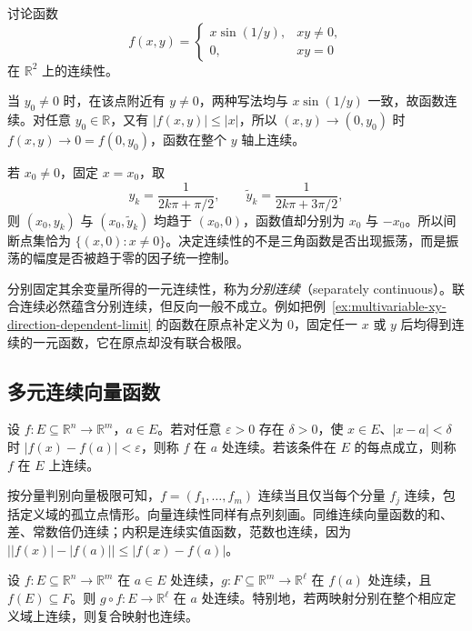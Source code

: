 \documentclass[UTF8,12pt,a4paper,fontset=fandol]{ctexbook}
\begin{document}
\begin{example}
\label{ex:oscillatory-multivariable-continuity-set}
讨论函数
\[
    f(x,y)=\begin{cases}
        x\sin(1/y),&xy\neq0,\\
        0,&xy=0
    \end{cases}
\]
在 $\mathbb R^2$ 上的连续性。
\end{example}

\begin{solve}
当 $y_0\neq0$ 时，在该点附近有 $y\neq0$，两种写法均与 $x\sin(1/y)$ 一致，故函数连续。对任意 $y_0\in\mathbb R$，又有 $|f(x,y)|\leq|x|$，所以 $(x,y)\to(0,y_0)$ 时 $f(x,y)\to0=f(0,y_0)$，函数在整个 $y$ 轴上连续。

若 $x_0\neq0$，固定 $x=x_0$，取
\[
    y_k=\frac1{2k\pi+\pi/2},\qquad
    \widetilde y_k=\frac1{2k\pi+3\pi/2},
\]
则 $(x_0,y_k)$ 与 $(x_0,\widetilde y_k)$ 均趋于 $(x_0,0)$，函数值却分别为 $x_0$ 与 $-x_0$。所以间断点集恰为 $\{(x,0):x\neq0\}$。决定连续性的不是三角函数是否出现振荡，而是振荡的幅度是否被趋于零的因子统一控制。
\end{solve}

分别固定其余变量所得的一元连续性，称为\emph{分别连续}（separately continuous）。联合连续必然蕴含分别连续，但反向一般不成立。例如把例~\ref{ex:multivariable-xy-direction-dependent-limit} 的函数在原点补定义为 $0$，固定任一 $x$ 或 $y$ 后均得到连续的一元函数，它在原点却没有联合极限。

\subsection{多元连续向量函数}
\label{subsec:continuous-multivariable-vector-functions}

\begin{definition}
\label{def:relative-vector-function-continuity}
设 $f:E\subseteq\mathbb R^n\to\mathbb R^m$，$a\in E$。若对任意 $\varepsilon>0$ 存在 $\delta>0$，使 $x\in E$、$|x-a|<\delta$ 时 $|f(x)-f(a)|<\varepsilon$，则称 $f$ 在 $a$ 处连续。若该条件在 $E$ 的每点成立，则称 $f$ 在 $E$ 上连续。
\end{definition}

按分量判别向量极限可知，$f=(f_1,\ldots,f_m)$ 连续当且仅当每个分量 $f_j$ 连续，包括定义域的孤立点情形。向量连续性同样有点列刻画。同维连续向量函数的和、差、常数倍仍连续；内积是连续实值函数，范数也连续，因为 $\bigl||f(x)|-|f(a)|\bigr|\leq|f(x)-f(a)|$。

\begin{theorem}[复合向量函数的连续性]
\label{thm:continuous-vector-function-composition}
设 $f:E\subseteq\mathbb R^n\to\mathbb R^m$ 在 $a\in E$ 处连续，$g:F\subseteq\mathbb R^m\to\mathbb R^\ell$ 在 $f(a)$ 处连续，且 $f(E)\subseteq F$。则 $g\circ f:E\to\mathbb R^\ell$ 在 $a$ 处连续。特别地，若两映射分别在整个相应定义域上连续，则复合映射也连续。
\end{theorem}
\end{document}
